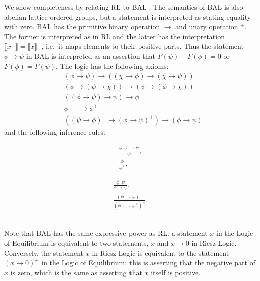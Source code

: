 \documentclass[journal,draftcls,onecolumn]{IEEEtran}
\theoremstyle{definition}
\newcommand{\interp}[1]{\llbracket #1 \rrbracket}
\begin{document}
We show completeness by relating RL to BAL \cite{Galli:04}. The
semantics of BAL is also abelian lattice ordered groups, but a
statement is interpreted as stating equality with zero. BAL has the
primitive binary operation $\rightarrow$ and unary operation
${}^+$. The former is interpreted as in RL and the latter has the
interpretation $\interp{x^+} = \interp{x}^+$, i.e.~it maps elements to
their positive parts. Thus the statement $\phi \rightarrow \psi$ in
BAL is interpreted as an assertion that $F(\psi) - F(\phi) = 0$ or
$F(\phi) = F(\psi)$. The logic has the following axioms:
\begin{align}
  \tag{BALB} &(\phi \rightarrow \psi) \rightarrow ((\chi \rightarrow \phi)
  \rightarrow (\chi \rightarrow \psi))\\
  \tag{BALC} &(\phi \rightarrow (\psi \rightarrow \chi)) \rightarrow
  (\psi \rightarrow (\phi \rightarrow \chi))\\
  \tag{BALN} &((\phi \rightarrow \psi) \rightarrow \psi) \rightarrow
  \phi\\
  \tag{BALP} &\phi^{++} \rightarrow\phi^+\\
  \tag{BALO} &((\psi\rightarrow\phi)^+
  \rightarrow(\phi\rightarrow\psi)^+)\rightarrow
  (\phi\rightarrow\psi)
\end{align}
and the following inference rules:\\
\begin{minipage}{0.49\columnwidth}
\begin{gather}
  \tag{BALMP} \frac{\phi, \phi \rightarrow \psi}{\psi},\\
  \tag{BALPI} \frac{\phi}{\phi^+},
\end{gather}
\end{minipage}
\begin{minipage}{0.49\columnwidth}
\begin{gather}
  \tag{BALG} \frac{\phi, \psi}{\phi \rightarrow \psi},\\
  \tag{BALMI} \frac{(\phi\rightarrow\psi)^+}{(\phi^+\rightarrow\psi^+)^+}.
\end{gather}
\end{minipage}
\vspace{0.3cm}\\
Note that BAL has the same expressive power as RL: a statement $x$ in
the Logic of Equilibrium is equivalent to two statements, $x$ and
$x\rightarrow 0$ in Riesz Logic. Conversely, the statement $x$ in
Riesz Logic is equivalent to the statement $(x\rightarrow 0)^+$ in the
Logic of Equilibrium: this is asserting that the negative part of $x$
is zero, which is the same as asserting that $x$ itself is positive.
\end{document}
